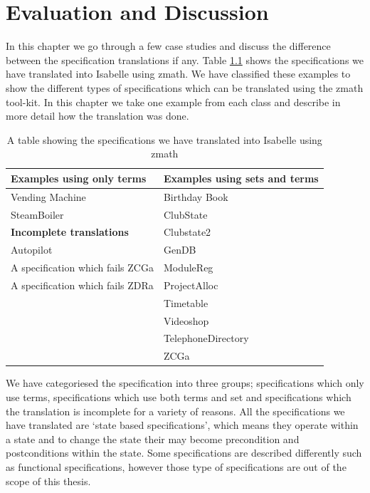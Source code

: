 \chapter{Evaluation and Discussion}
\label{ch:evaluation}

In this chapter we go through a few case studies and discuss the difference
between the specification translations if any. Table \ref{tab:specstranslated}
shows the specifications we have translated into Isabelle using \gls{zmath}. We
have classified these examples to show the different types of specifications
which can be translated using the \gls{zmath} tool-kit. In this chapter we take
one example from each class and describe in more detail how the translation was
done.

\begin{table}[H]
\begin{tabular}{|l|l|}
\hline
\textbf{Examples using only terms} & \textbf{Examples using sets and terms} \\
\hline
Vending Machine & Birthday Book \\
SteamBoiler & ClubState \\
\cline{1-1}
\cline{1-1}
\textbf{Incomplete translations} & Clubstate2 \\
\cline{1-1}
Autopilot & GenDB \\
A specification which fails ZCGa & ModuleReg \\
A specification which fails ZDRa & ProjectAlloc \\
& Timetable \\
& Videoshop \\
& TelephoneDirectory \\
& ZCGa \\
\hline
\end{tabular}
\caption{A table showing the specifications we have translated into Isabelle using \gls{zmath} \label{tab:specstranslated}}
\end{table}

We have categoriesed the specification into three groups; specifications which
only use terms, specifications which use both terms and set and specifications
which the translation is incomplete for a variety of reasons. All the
specifications we have translated are `state based specifications', which means
they operate within a state and to change the state their may become
precondition and postconditions within the state. Some specifications are
described differently such as functional specifications, however those type of
specifications are out of the scope of this thesis.

